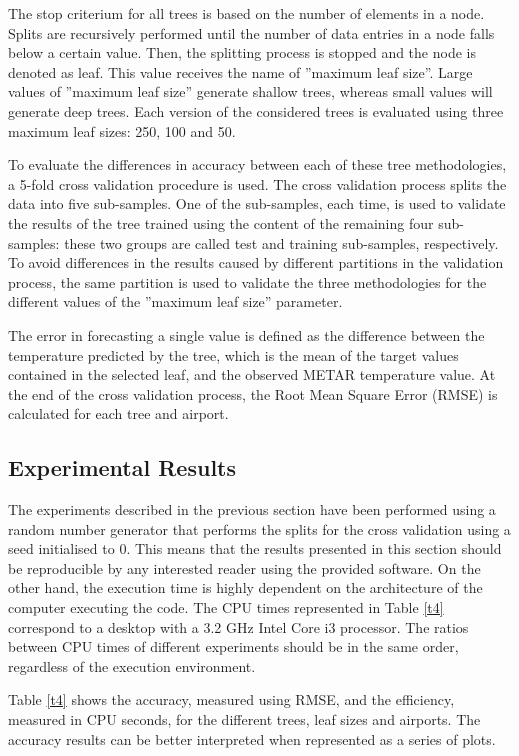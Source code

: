 \documentclass[times,twocolumn,final,authoryear]{elsarticle}
\begin{document}
The stop criterium for all trees is based on the number of elements in a node. Splits are recursively performed until the number of data entries in a node falls below a certain value. Then, the splitting process is stopped and the node is denoted as leaf. This value receives the name of ”maximum leaf size”. Large values of ”maximum leaf size” generate shallow trees, whereas small values will generate deep trees. Each version of the considered trees is evaluated using three maximum leaf sizes: 250, 100 and 50.

To evaluate the differences in accuracy between each of these tree methodologies, a 5-fold cross validation procedure is used. The cross validation process splits the data into five sub-samples. One of the sub-samples, each time, is used to validate the results of the tree trained using the content of the remaining four sub-samples: these two groups are called test and training sub-samples, respectively. To avoid differences in the results caused by different partitions in the validation process, the same partition is used to validate the three methodologies for the different values of the ”maximum leaf size” parameter.

The error in forecasting a single value is defined as the difference between the temperature predicted by the tree, which is the mean of the target values contained in the selected leaf, and the observed METAR temperature value. At the end of the cross validation process, the Root Mean Square Error (RMSE) is calculated for each tree and airport.


\subsection{Experimental Results}
\label{sec:4.3}

The experiments described in the previous section have been performed using a random number generator that performs the splits for the cross validation using a seed initialised to $0$. This means that the results presented in this section should be reproducible by any interested reader using the provided software. On the other hand, the execution time is highly dependent on the architecture of the computer executing the code. The CPU times represented in Table \ref{t4} correspond to a desktop with a 3.2 GHz Intel Core i3 processor. The ratios between CPU times of different experiments should be in the same order, regardless of the execution environment.

Table \ref{t4} shows the accuracy, measured using RMSE, and the efficiency, measured in CPU seconds, for the different trees, leaf sizes and airports. The accuracy results can be better interpreted when represented as a series of plots.
\end{document}
